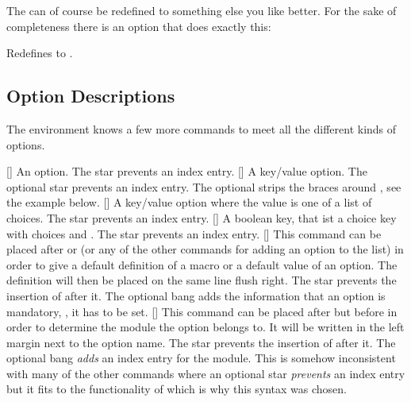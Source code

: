\documentclass[load-preamble+,babel-options={ngerman,english}]{cnltx-doc}
\begin{document}
The  can of course be redefined to something else you like
better.  For the sake of completeness there is an option that does exactly
this:
\begin{options}
    Redefines  to .
\end{options}

\subsection{Option Descriptions}\label{sec:usage:options}
The  environment knows a few more commands to meet all the
different kinds of options.
\begin{commands}
  [\sarg]
    An option.  The star prevents an index entry.
  [\sarg\code{-}]
    A key/value option.  The optional star prevents an index entry.  The
    optional \code{-} strips the braces around , see the example
    below.
  [\sarg{}]
    A key/value option where the value is one of a list of choices.  The star
    prevents an index entry.
  [\sarg{}]
    A boolean key, that ist a choice key with choices  and 
    .  The star prevents an index entry.
  [\sarg\code{!}]
    This command can be placed after  or
     (or any of the other commands for adding an option to the
     list) in order to give a default definition of a macro or a
    default value of an option.  The definition will then be placed on the
    same line flush right.  The star prevents the insertion of 
    after it. The optional bang adds the information that an option is
    mandatory, \ie, it has to be set.
  [\sarg\code{!}]
    This command can be placed after  but before
     in order to determine the module the option belongs to.  It
    will be written in the left margin next to the option name.  The star
    prevents the insertion of  after it.  The optional bang
    \emph{adds} an index entry for the module.  This is somehow inconsistent
    with many of the other commands where an optional star \emph{prevents} an
    index entry but it fits to the functionality of  which is why
    this syntax was chosen.
\end{commands}
\end{document}
